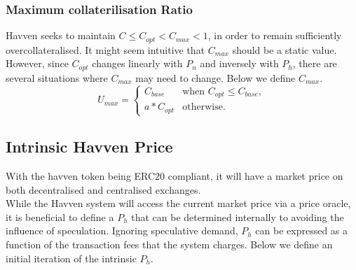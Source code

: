 \newpage

\subsubsection{Maximum collaterilisation Ratio}

\noindent Havven seeks to maintain $C \leq C_{opt} < C_{max} < 1$, in order to remain sufficiently overcollateralised. It might seem intuitive that $C_{max}$ should be a static value. However, since $C_{opt}$ changes linearly with $P_n$ and inversely with $P_h$, there are several situations where $C_{max}$ may need to change. Below we define $C_{max}$. \\

\[
U_{max} = 
\begin{cases}
 C_{base} &\mbox{when } C_{opt} \leq C_{base}, \\[1em]
 a * C_{opt} &\mbox{otherwise}.
 \end{cases}
\]

\begin{center}
\end{center}

\newpage

\subsection{Intrinsic Havven Price} With the havven token being ERC20 compliant, it will have a market price on both decentralised and centralised exchanges. \\

\noindent While the Havven system will access the current market price via a price oracle, it is beneficial to define a $P_h$ that can be determined internally to avoiding the influence of speculation. Ignoring speculative demand, $P_h$ can be expressed as a function of the transaction fees that the system charges. Below we define an initial iteration of the intrinsic $P_h$.

